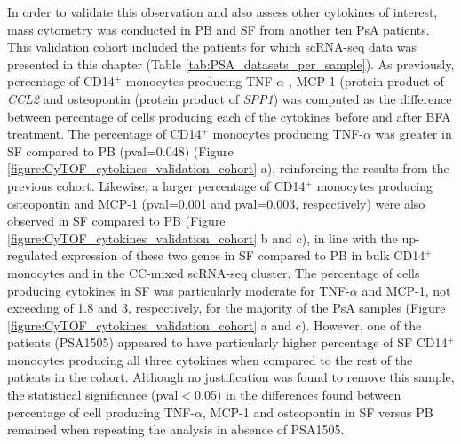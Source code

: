 In order to validate this observation and also assess other cytokines of interest, mass cytometry was conducted in PB and SF from another ten PsA patients. This validation cohort included the patients for which scRNA-seq data was presented in this chapter (Table \ref{tab:PSA_datasets_per_sample}). As previously, percentage of CD14$^+$ monocytes producing TNF-$\alpha$ , MCP-1 (protein product of \textit{CCL2} and osteopontin (protein product of \textit{SPP1}) was computed as the difference between percentage of cells producing each of the cytokines before and after BFA treatment. The percentage of CD14$^+$ monocytes producing TNF-$\alpha$ was greater in SF compared to PB (pval=0.048) (Figure \ref{figure:CyTOF_cytokines_validation_cohort} a), reinforcing the results from the previous cohort. Likewise, a larger percentage of CD14$^+$ monocytes producing osteopontin and MCP-1 (pval=0.001 and pval=0.003, respectively) were also observed in SF compared to PB (Figure \ref{figure:CyTOF_cytokines_validation_cohort} b and c), in line with the up-regulated expression of these two genes in SF compared to PB in bulk CD14$^+$ monocytes and in the CC-mixed scRNA-seq cluster. The percentage of cells producing cytokines in SF was particularly moderate for TNF-$\alpha$ and MCP-1, not exceeding of 1.8 and 3, respectively, for the majority of the PsA samples (Figure \ref{figure:CyTOF_cytokines_validation_cohort} a and c). However, one of the patients (PSA1505) appeared to have particularly higher percentage of SF CD14$^+$ monocytes producing all three cytokines when compared to the rest of the patients in the cohort. Although no justification was found to remove this sample, the statistical significance (pval$<$0.05) in the differences found between percentage of cell producing TNF-$\alpha$, MCP-1 and osteopontin in SF versus PB remained when repeating the analysis in absence of PSA1505.



